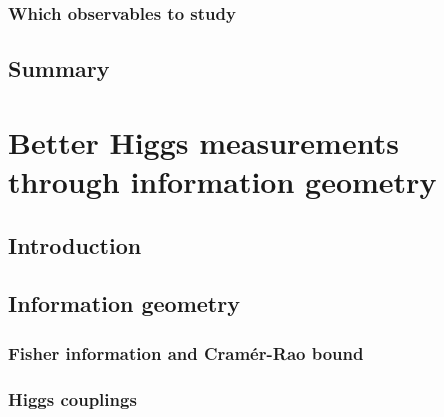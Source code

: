 \subsection{Which observables to study}

\section{Summary}
\label{sec:validity_summary}





\chapter{Better Higgs measurements through information geometry}
\label{chapter:information}


\section{Introduction}
\label{sec:information_intro}

\section{Information geometry}
\label{sec:information_formalism}

\subsection{Fisher information and Cram\'er-Rao bound}

\subsection{Higgs couplings}

